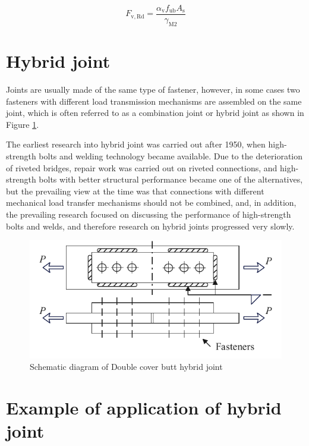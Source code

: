 \begin{equation}
F_{\mathrm{v}, \mathrm{Rd}}=\frac{\alpha_{\mathrm{v}} f_{\mathrm{ub}} A_{\mathrm{s}}}{\gamma_{\mathrm{M} 2}}
\end{equation}

\section{Hybrid joint}

Joints are usually made of the same type of fastener, however, in some cases two fasteners with different load transmission mechanisms are assembled on the same joint, which is often referred to as a combination joint or hybrid joint as shown in Figure \ref{fig-schehyb}.

The earliest research into hybrid joint was carried out after 1950, when high-strength bolts and welding technology became available. Due to the deterioration of riveted bridges, repair work was carried out on riveted connections, and high-strength bolts with better structural performance became one of the alternatives, but the prevailing view at the time was that connections with different mechanical load transfer mechanisms should not be combined, and, in addition, the prevailing research focused on discussing the performance of high-strength bolts and welds, and therefore research on hybrid joints progressed very slowly.

\begin{figure}[ht]
    \centering
    \includegraphics[width=0.75\linewidth]{imgs//ch2/hybrid-sche.pdf}
    \caption{Schematic diagram of Double cover butt hybrid joint}
    \label{fig-schehyb}
\end{figure}

\section{Example of application of hybrid joint}



